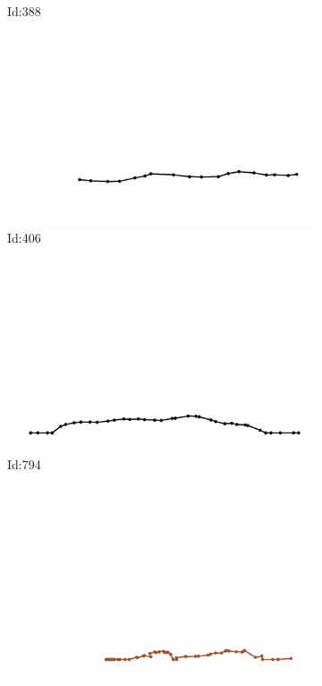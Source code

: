 \documentclass[12pt,twoside]{report}
\begin{document}
\begin{figure}
\begin{subfigure}[b]{0.20\textwidth}
\caption{Id:388}
\end{subfigure}
\begin{subfigure}[b]{0.20\textwidth}
\centering
\includegraphics[width=\textwidth]{../../trajectories/406.png}
\caption{Id:406}
\end{subfigure}
\begin{subfigure}[b]{0.20\textwidth}
\centering
\includegraphics[width=\textwidth]{../../trajectories/794.png}
\caption{Id:794}
\end{subfigure}
\begin{subfigure}[b]{0.20\textwidth}
\centering
\includegraphics[width=\textwidth]{../../trajectories/838.png}

\end{subfigure}
\end{figure}
\end{document}

